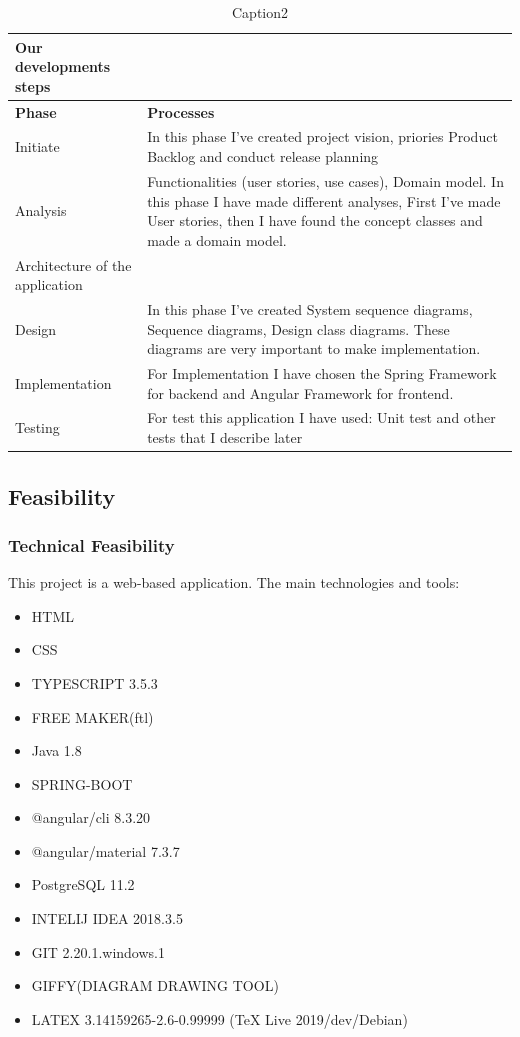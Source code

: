 \documentclass{scrartcl}
\begin{document}
\begin{table}[h]
\begin{center}
\begin{tabular}{| p{7cm}| p{7cm} |}
Our developments steps \\
\hline
\textbf{Phase} & \textbf{Processes} \\
\hline
Initiate                    &             In this phase I've created project vision, priories Product Backlog and conduct release planning \\ \hline
Analysis                    &             Functionalities (user stories, use cases), Domain model. In this phase I have made different analyses, First I've made User stories, then I have found the concept classes and made a domain model.\\ \hline
Architecture of the application                   &           \\ \hline
Design                   &        In this phase I've created  System sequence diagrams, Sequence diagrams, Design class diagrams. These diagrams are very important to make implementation. \\ \hline
Implementation                   &           For Implementation I have chosen the Spring Framework for backend and Angular Framework for frontend.\\ \hline
Testing                   &            For test this application I have used: Unit test and other tests that I describe later\\ \hline

\end{tabular}
\end{center}
\caption{Caption2}
\label{table2}
\end{table}

\subsection{Feasibility}
\subsubsection{Technical Feasibility}
This project is a web-based application. The main technologies and tools:
\begin{itemize}
  	\item HTML
  	\item CSS
  	\item TYPESCRIPT 3.5.3
  	\item FREE MAKER(ftl)
  	\item Java 1.8
  	\item SPRING-BOOT 
  	\item @angular/cli  8.3.20
  	\item @angular/material  7.3.7
  	\item PostgreSQL  11.2
  	\item INTELIJ IDEA  2018.3.5
  	\item GIT  2.20.1.windows.1
  	\item GIFFY(DIAGRAM DRAWING TOOL)
  	\item LATEX 3.14159265-2.6-0.99999 (TeX Live 2019/dev/Debian)

  
  	
  	\end{itemize}
\end{document}
